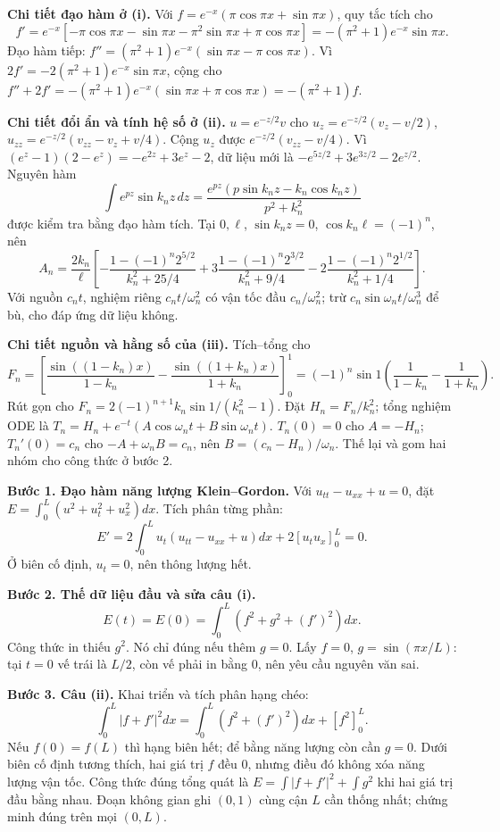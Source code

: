 \textbf{Chi tiết đạo hàm ở (i).} Với $f=e^{-x}(\pi\cos\pi x+\sin\pi x)$, quy tắc tích cho
\[f'=e^{-x}[-\pi\cos\pi x-\sin\pi x-\pi^2\sin\pi x+\pi\cos\pi x]
=-(\pi^2+1)e^{-x}\sin\pi x.\]
Đạo hàm tiếp: $f''=(\pi^2+1)e^{-x}(\sin\pi x-\pi\cos\pi x)$. Vì $2f'=-2(\pi^2+1)e^{-x}\sin\pi x$, cộng cho $f''+2f'=-(\pi^2+1)e^{-x}(\sin\pi x+\pi\cos\pi x)=-(\pi^2+1)f$.

\textbf{Chi tiết đổi ẩn và tính hệ số ở (ii).} $u=e^{-z/2}v$ cho $u_z=e^{-z/2}(v_z-v/2)$, $u_{zz}=e^{-z/2}(v_{zz}-v_z+v/4)$. Cộng $u_z$ được $e^{-z/2}(v_{zz}-v/4)$. Vì $(e^z-1)(2-e^z)=-e^{2z}+3e^z-2$, dữ liệu mới là $-e^{5z/2}+3e^{3z/2}-2e^{z/2}$. Nguyên hàm
\[\int e^{pz}\sin k_nz\,dz=
\frac{e^{pz}(p\sin k_nz-k_n\cos k_nz)}{p^2+k_n^2}\]
được kiểm tra bằng đạo hàm tích. Tại $0,\ell$, $\sin k_nz=0$, $\cos k_n\ell=(-1)^n$, nên
\[A_n=\frac{2k_n}{\ell}\left[
-\frac{1-(-1)^n2^{5/2}}{k_n^2+25/4}
+3\frac{1-(-1)^n2^{3/2}}{k_n^2+9/4}
-2\frac{1-(-1)^n2^{1/2}}{k_n^2+1/4}\right].\]
Với nguồn $c_nt$, nghiệm riêng $c_nt/\omega_n^2$ có vận tốc đầu $c_n/\omega_n^2$; trừ $c_n\sin\omega_nt/\omega_n^3$ để bù, cho đáp ứng dữ liệu không.

\textbf{Chi tiết nguồn và hằng số của (iii).} Tích–tổng cho
\[F_n=\left[\frac{\sin((1-k_n)x)}{1-k_n}
-\frac{\sin((1+k_n)x)}{1+k_n}\right]_0^1
=(-1)^n\sin1\left(\frac1{1-k_n}-\frac1{1+k_n}\right).\]
Rút gọn cho $F_n=2(-1)^{n+1}k_n\sin1/(k_n^2-1)$. Đặt $H_n=F_n/k_n^2$; tổng nghiệm ODE là $T_n=H_n+e^{-t}(A\cos\omega_nt+B\sin\omega_nt)$. $T_n(0)=0$ cho $A=-H_n$; $T_n'(0)=c_n$ cho $-A+\omega_nB=c_n$, nên $B=(c_n-H_n)/\omega_n$. Thế lại và gom hai nhóm cho công thức ở bước 2.

\textbf{Bước 1. Đạo hàm năng lượng Klein–Gordon.} Với $u_{tt}-u_{xx}+u=0$, đặt $E=\int_0^L(u^2+u_t^2+u_x^2)dx$. Tích phân từng phần:
\[E'=2\int_0^Lu_t(u_{tt}-u_{xx}+u)dx+2[u_tu_x]_0^L=0.\]
Ở biên cố định, $u_t=0$, nên thông lượng hết.

\textbf{Bước 2. Thế dữ liệu đầu và sửa câu (i).}
\[E(t)=E(0)=\int_0^L(f^2+g^2+(f')^2)dx.\]
Công thức in thiếu $g^2$. Nó chỉ đúng nếu thêm $g=0$. Lấy $f=0$, $g=\sin(\pi x/L)$: tại $t=0$ vế trái là $L/2$, còn vế phải in bằng $0$, nên yêu cầu nguyên văn sai.

\textbf{Bước 3. Câu (ii).} Khai triển và tích phân hạng chéo:
\[\int_0^L|f+f'|^2dx=\int_0^L(f^2+(f')^2)dx+[f^2]_0^L.\]
Nếu $f(0)=f(L)$ thì hạng biên hết; để bằng năng lượng còn cần $g=0$. Dưới biên cố định tương thích, hai giá trị $f$ đều $0$, nhưng điều đó không xóa năng lượng vận tốc. Công thức đúng tổng quát là $E=\int|f+f'|^2+\int g^2$ khi hai giá trị đầu bằng nhau. Đoạn không gian ghi $(0,1)$ cùng cận $L$ cần thống nhất; chứng minh đúng trên mọi $(0,L)$.

